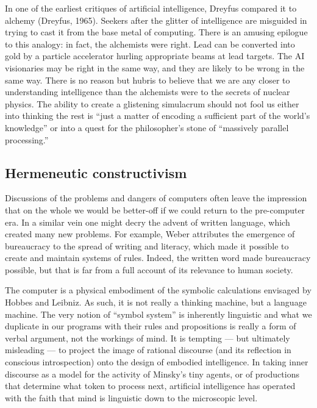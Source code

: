 \documentclass[12pt]{article}
\begin{document}
In one of the earliest critiques of artificial intelligence, Dreyfus compared it to alchemy (Dreyfus, 1965). Seekers after the glitter of intelligence are misguided in trying to cast it from the base metal of computing. There is an amusing epilogue to this analogy: in fact, the alchemists were right. Lead can be converted into gold by a particle accelerator hurling appropriate beams at lead targets. The AI visionaries may be right in the same way, and they are likely to be wrong in the same way. There is no reason but hubris to believe that we are any closer to understanding intelligence than the alchemists were to the secrets of nuclear physics. The ability to create a glistening simulacrum should not fool us either into thinking the rest is “just a matter of encoding a sufficient part of the world’s knowledge” or into a quest for the philosopher’s stone of “massively parallel processing.”

\subsection{Hermeneutic constructivism}

Discussions of the problems and dangers of computers often leave the impression that on the whole we would be better-off if we could return to the pre-computer era. In a similar vein one might decry the advent of written language, which created many new problems. For example, Weber attributes the emergence of bureaucracy to the spread of writing and literacy, which made it possible to create and maintain systems of rules. Indeed, the written word made bureaucracy possible, but that is far from a full account of its relevance to human society.

The computer is a physical embodiment of the symbolic calculations envisaged by Hobbes and Leibniz. As such, it is not really a thinking machine, but a language machine. The very notion of “symbol system” is inherently linguistic and what we duplicate in our programs with their rules and propositions is really a form of verbal argument, not the workings of mind. It is tempting --- but ultimately misleading --- to project the image of rational discourse (and its reflection in conscious introspection) onto the design of embodied intelligence. In taking inner discourse as a model for the activity of Minsky’s tiny agents, or of productions that determine what token to process next, artificial intelligence has operated with the faith that mind is linguistic down to the microscopic level.
\end{document}
